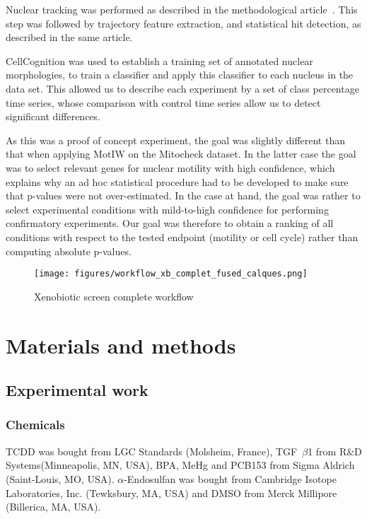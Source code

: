 Nuclear tracking was performed as described in the methodological article~\cite{motiw}. This step was followed by trajectory feature extraction, and statistical hit detection, as described in the same article.

CellCognition was used to establish a training set of annotated nuclear morphologies, to train a classifier and apply this classifier to each nucleus in the data set. This allowed us to describe each experiment by a set of class percentage time series, whose comparison with control time series allow us to detect significant differences.

As this was a proof of concept experiment, the goal was slightly different than that when applying MotIW on the Mitocheck dataset. In the latter case the goal was to select relevant genes for nuclear motility with high confidence, which explains why an ad hoc statistical procedure had to be developed to make sure that p-values were not over-estimated. In the case at hand, the goal was rather to select experimental conditions with mild-to-high confidence for performing confirmatory experiments. Our goal was therefore to obtain a ranking of all conditions with respect to the tested endpoint (motility or cell cycle) rather than computing absolute p-values.

\begin{figure}[!ht]
\centering
\texttt{[image: figures/workflow\_xb\_complet\_fused\_calques.png]}
\caption{Xenobiotic screen complete workflow}
\label{xbsc_workflow}
\end{figure}

\section{Materials and methods}
\label{protocoles}
\subsection{Experimental work}
\subsubsection{Chemicals}
TCDD was bought from LGC Standards (Molsheim, France), TGF~$\beta$1 from R\&D Systems\texttrademark (Minneapolis, MN, USA), BPA, MeHg and PCB153 from Sigma Aldrich\up{\textregistered} (Saint-Louis, MO, USA). $\alpha$-Endosulfan was bought from Cambridge Isotope Laboratories, Inc. (Tewksbury, MA, USA) and DMSO from Merck Millipore (Billerica, MA, USA).

